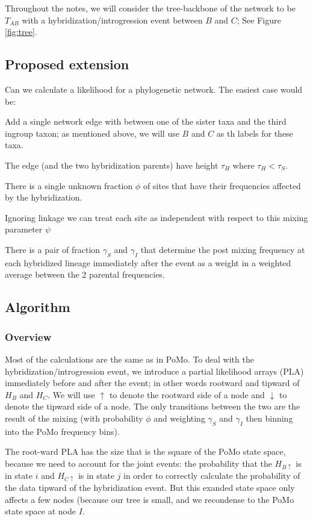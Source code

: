 \documentclass{article}
\begin{document}
Throughout the notes, we will consider the tree-backbone of the network to be $T_{AB}$ with a hybridization/introgression event between $B$ and $C$; See Figure \ref{fig:tree}.

\subsection{Proposed extension}
Can we calculate a likelihood for a phylogenetic network. 
The easiest case would be:
\begin{compactitem}
    \item Add a single network edge with between one of the sister taxa and the third ingroup taxon; as mentioned above, we will use $B$ and $C$ as th labels for these taxa.
    \item The edge (and the two hybridization parents) have height $\tau_H$ where $\tau_H < \tau_S$.
    \item There is a single unknown fraction $\phi$ of sites that have their frequencies affected by the hybridization.
    \item Ignoring linkage we can treat each site as independent with respect to this mixing parameter $\psi$
    \item There is a pair of fraction $\gamma_S$ and $\gamma_I$ that determine the post mixing frequency at each hybridized lineage immediately after the event as a weight in a weighted average between the 2 parental frequencies.
\end{compactitem}

\subsection{Algorithm}
\subsubsection{Overview}
Most of the calculations are the same as in PoMo.
To deal with the hybridization/introgression event, we introduce a partial likelihood arrays (PLA) immediately before and after the event; in other words rootward and tipward of $H_B$ and $H_C$.
We will use $\uparrow$ to denote the rootward side of a node and $\downarrow$ to denote the tipward side of a node.
The only transitions between the two are the result of the mixing (with probability $\phi$ and weighting $\gamma_S$ and $\gamma_I$ then binning into the PoMo frequency bins).


The root-ward PLA has the size that is the square of the PoMo state space, because we need to account for the joint events: the probability that the $H_{B\uparrow}$ is in state $i$ and $H_{C\uparrow}$ is in state $j$ in order to correctly calculate the probability of the data tipward of the hybridization event.
But this exanded state space only affects a few nodes (because our tree is small, and we recondense to the PoMo state space at node $I$.
\end{document}
